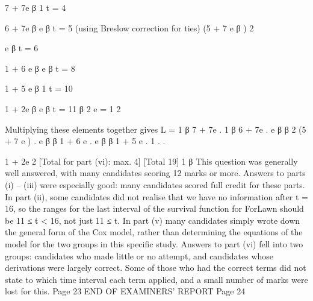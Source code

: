 \documentclass[a4paper,12pt]{article}
\begin{document}
7 + 7e β
1
t = 4

6 + 7e β
e β
t = 5
(using Breslow correction for ties)
(5 + 7 e β ) 2

e β
t = 6

1 + 6 e β
e β
t = 8

1 + 5 e β
1
t = 10

1 + 2e β
e β
t = 11
β
2 e
=
1
2

Multiplying these elements together gives
L =
1
β
7 + 7e
.
1
β
6 + 7e
.
e β
β 2
(5 + 7 e )
.
e β
β
1 + 6 e
.
e β
β
1 + 5 e
.
1
. .

1 + 2e 2
[Total for part (vi): max. 4]
[Total 19]
1
β
This question was generally well answered, with many candidates
scoring 12 marks or more. Answers to parts (i) – (iii) were especially
good: many candidates scored full credit for these parts. In part (ii),
some candidates did not realise that we have no information after t =
16, so the ranges for the last interval of the survival function for
ForLawn should be 11 ≤ t < 16, not just 11 ≤ t. In part (v) many
candidates simply wrote down the general form of the Cox model,
rather than determining the equations of the model for the two groups
in this specific study. Answers to part (vi) fell into two groups:
candidates who made little or no attempt, and candidates whose
derivations were largely correct. Some of those who had the correct
terms did not state to which time interval each term applied, and a
small number of marks were lost for this.
Page 23
END OF EXAMINERS’ REPORT
Page 24
\end{document}
